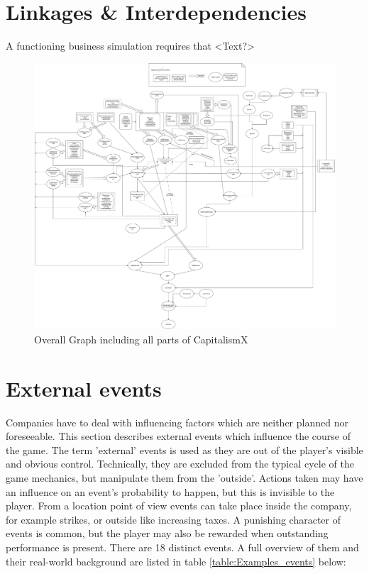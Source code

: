 \documentclass[11pt,titlepage,oneside,openany]{book}
\begin{document}
\section{Linkages \& Interdependencies}
\label{sec:link}
A functioning business simulation requires that 
<Text?>
\begin{landscape}
\begin{figure}
    \centering
    \includegraphics[scale = 0.26]{images/Tree-like-thing.pdf}
    \caption{Overall Graph including all parts of CapitalismX}
    \label{fig:OverallGraph}
\end{figure}
\end{landscape}

\section{External events}
\label{sec:ectEvent}
Companies have to deal with influencing factors which are neither planned nor foreseeable\cite{Campbell}. This section describes external events which influence the course of the game. The term 'external' events is used as they are out of the player's visible and obvious control. Technically, they are excluded from the typical cycle of the game mechanics, but manipulate them from the 'outside'. Actions taken may have an influence on an event's probability to happen, but this is invisible to the player. From a location point of view events can take place inside the company, for example strikes, or outside like increasing taxes. A punishing character of events is common, but the player may also be rewarded when outstanding performance is present. There are 18 distinct events. A full overview of them and their real-world background are listed in table \ref{table:Examples_events} below: \\ 
\end{document}
